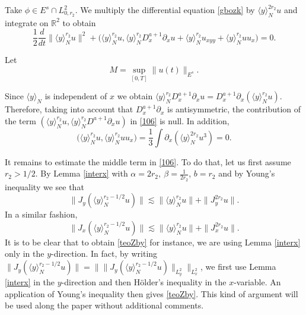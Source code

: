 \documentclass[reqno]{amsart}
\newcommand{\R}{\mathbb R}
\numberwithin{equation}{section}
\begin{document}
Take  $\phi \in E^s\cap L^2_{0,r_2}$. We multiply  the differential equation
\eqref{gbozk} by $\langle y \rangle_{N}^{2r_2}u$ and integrate on $\R^{2}$ to obtain
\begin{equation}\label{106}
\frac{1}{2}\frac{d}{dt}\|\langle y \rangle_{N}^{r_2}u\|^{2}+
\Big(\langle y \rangle_{N}^{r_2}u,\langle y \rangle_{N}^{r_2}D^{a+1}_x\partial_x u +
\langle y \rangle_{N}^{r_2}u_{xyy}+\langle y \rangle_{N}^{r_2}uu_{x}\Big)=0.
\end{equation}

Let
\begin{equation}\label{Mdef}
M=\sup_{[0,T]}\|u(t)\|_{E^s}.
\end{equation}

Since $\langle y \rangle_{N}$ is independent of $x$ we obtain $\langle y \rangle_{N}^{r_2}D^{a+1}_x\partial_x u=D^{a+1}_x \partial_{x}(\langle y \rangle_{N}^{r_2}u)$. Therefore, taking into account that $D^{a+1}_x\partial_x$ is antisymmetric,
 the contribution of the term $(\langle y \rangle_{N}^{r_2}u,\langle y \rangle_{N}^{r_2}D^{a+1}\partial_x u)$ in \eqref{106} is null. In addition,
 \begin{equation*}
 \big(\langle y \rangle_{N}^{r_2}u,\langle y \rangle_{N}^{r_2}uu_{x}\big)=\frac{1}{3}\int\partial_x(\langle y \rangle_{N}^{2r_2}u^3)=0.
 \end{equation*}

It remains to estimate the middle term in \eqref{106}. To do that, let us first assume $r_2>1/2$.
By Lemma \ref{interx} with $\alpha=2r_2, \
\beta=\frac{1}{2r_2}$, $b=r_2$ and by Young's inequality we see that
\begin{equation}\label{teoZby}
\|J_{y}(\langle y \rangle_{N}^{r_{2}-1/2}u)\|\lesssim \|\langle y \rangle_{N}^{r_2}u\|+\|J^{2r_2}_{y}u\|.
\end{equation}
In a similar fashion,
\begin{equation}\label{teoZbx}
\|J_{x}(\langle y \rangle_{N}^{r_{2}-1/2}u)\|\lesssim \|\langle y \rangle_{N}^{r_2}u\|+\|J_{x}^{2r_2}u\|.
\end{equation}
It is to be clear that to obtain \eqref{teoZby} for instance, we are using Lemma \ref{interx} only in the $y$-direction. In fact, by writing $\|J_{y}(\langle y \rangle_{N}^{r_{2}-1/2}u)\|=\|\|J_{y}(\langle y \rangle_{N}^{r_{2}-1/2}u)\|_{L^2_y}\|_{L^2_x}$, we first use Lemma \ref{interx} in the $y$-direction and then H\"older's inequality in the $x$-variable. An application of Young's inequality then gives \eqref{teoZby}. This kind of argument will be used along the paper without additional comments.
\end{document}
